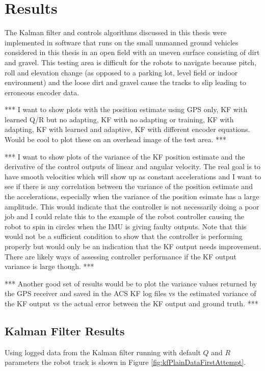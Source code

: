 \chapter{Results}
\label{ch:results}
The Kalman filter and controls algorithms discussed in this thesis were implemented in software that runs on the small unmanned ground vehicles considered in this thesis in an open field with an uneven surface consisting of dirt and gravel. This testing area is difficult for the robots to navigate because pitch, roll and elevation change (as opposed to a parking lot, level field or indoor environment) and the loose dirt and gravel cause the tracks to slip leading to erroneous encoder data.

*** I want to show plots with the position estimate using GPS only, KF with learned Q/R but no adapting, KF with no adapting or training, KF with adapting, KF with learned and adaptive, KF with different encoder equations. Would be cool to plot these on an overhead image of the test area. ***

*** I want to show plots of the variance of the KF position estimate and the derivative of the control outputs of linear and angular velocity. The real goal is to have smooth velocities which will show up as constant accelerations and I want to see if there is any correlation between the variance of the position estimate and the accelerations, especially when the variance of the position esimate has a large amplitude. This would indicate that the controller is not necessarily doing a poor job and I could relate this to the example of the robot controller causing the robot to spin in circles when the IMU is giving faulty outputs. Note that this would not be a sufficient condition to show that the controller is performing properly but would only be an indication that the KF output needs improvement. There are likely ways of assessing controller performance if the KF output variance is large though. ***

*** Another good set of results would be to plot the variance values returned by the GPS receiver and saved in the ACS KF log files vs the estimated variance of the KF output vs the actual error between the KF output and ground truth. ***

\section{Kalman Filter Results}
\label{sec:kfResults}
Using logged data from the Kalman filter running with default $Q$ and $R$ parameters the robot track is shown in Figure \ref{fig:kfPlainDataFirstAttempt}.

